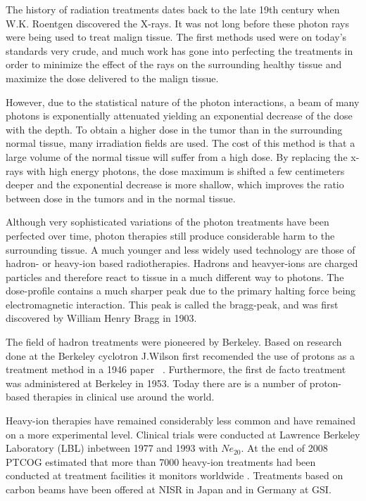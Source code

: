 The history of radiation treatments dates back to the late 19th century when W.K. Roentgen discovered the X-rays. It was not long before these photon rays were being used to treat malign tissue. The first methods used were on today's standards very crude, and much work has gone into perfecting the treatments in order to minimize the effect of the rays on the surrounding healthy tissue and maximize the dose delivered to the malign tissue.

However, due to the statistical nature of the photon interactions, a beam of many photons is
exponentially attenuated yielding an exponential decrease of the dose with the depth. To
obtain a higher dose in the tumor than in the surrounding normal tissue, many irradiation
fields are used. The cost of this method is that a large volume of the normal tissue
will suffer from a high dose. By replacing the x-rays with high energy photons, the dose
maximum is shifted a few centimeters deeper and the exponential decrease is more shallow,
which improves the ratio between dose in the tumors and in the normal tissue.

Although very sophisticated variations of the photon treatments have been perfected over time, photon therapies still produce considerable harm to the surrounding tissue. A much younger and less widely used technology are those of hadron- or heavy-ion based radiotherapies. Hadrons and heavyer-ions are charged particles and therefore react to tissue in a much different way to photons. The dose-profile contains a much sharper peak due to the primary halting force being electromagnetic interaction. This peak is called the bragg-peak, and was first discovered by William Henry Bragg in 1903.

The field of hadron treatments were pioneered by Berkeley. Based on research done at the Berkeley cyclotron J.Wilson first recomended the use of protons as a treatment method in a 1946 paper ~\cite{RW46}. Furthermore, the first de facto treatment was administered at Berkeley in 1953. Today there are is a number of proton-based therapies in clinical use around the world.

Heavy-ion therapies have remained considerably less common and have remained on a more experimental level. Clinical trials were conducted at Lawrence Berkeley Laboratory (LBL) inbetween 1977 and 1993 with $Ne_20$. At the end of 2008 PTCOG estimated that more than 7000 heavy-ion treatments had been conducted at treatment facilities it monitors worldwide . Treatments based on carbon beams have been offered at NISR in Japan and in Germany at GSI.~\cite{PTCOGstats}

